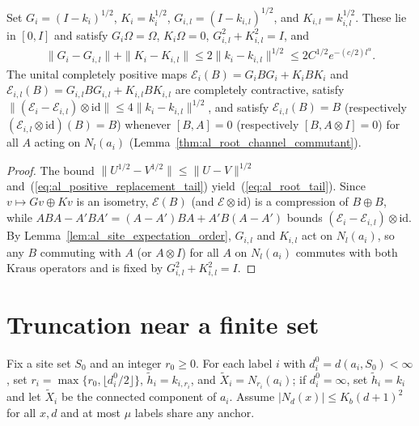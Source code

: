 \begin{lemma}
    \label{lem:al_quasilocal_roots}
    \leanok
    Set $G_i=(I-k_i)^{1/2}$, $K_i=k_i^{1/2}$, $G_{i,l}=(I-k_{i,l})^{1/2}$, and
    $K_{i,l}=k_{i,l}^{1/2}$. These lie in $[0,I]$ and satisfy
    $G_i\Omega=\Omega$, $K_i\Omega=0$, $G_{i,l}^2+K_{i,l}^2=I$, and
    \begin{align}
        \|G_i-G_{i,l}\|+\|K_i-K_{i,l}\|
        \le2\|k_i-k_{i,l}\|^{1/2}\le2C^{1/2}e^{-(c/2)l^\alpha}.
        \label{eq:al_root_tail}
    \end{align}
    The unital completely positive maps $\mathcal E_i(B)=G_iBG_i+K_iBK_i$ and
    $\mathcal E_{i,l}(B)=G_{i,l}BG_{i,l}+K_{i,l}BK_{i,l}$ are completely
    contractive, satisfy
    $\|(\mathcal E_i-\mathcal E_{i,l})\otimes\mathrm{id}\|\le4\|k_i-k_{i,l}\|^{1/2}$,
    and satisfy $\mathcal E_{i,l}(B)=B$ (respectively
    $(\mathcal E_{i,l}\otimes\mathrm{id})(B)=B$) whenever $[B,A]=0$ (respectively
    $[B,A\otimes I]=0$) for all $A$ acting on $N_l(a_i)$
    (Lemma~\ref{thm:al_root_channel_commutant}).
\end{lemma}
\begin{proof}\leanok
    The bound $\|U^{1/2}-V^{1/2}\|\le\|U-V\|^{1/2}$ and~(\ref{eq:al_positive_replacement_tail})
    yield~(\ref{eq:al_root_tail}). Since $v\mapsto Gv\oplus Kv$ is an isometry,
    $\mathcal E(B)$ (and $\mathcal E\otimes\mathrm{id}$) is a compression of
    $B\oplus B$, while $ABA-A'BA'=(A-A')BA+A'B(A-A')$ bounds
    $(\mathcal E_i-\mathcal E_{i,l})\otimes\mathrm{id}$. By
    Lemma~\ref{lem:al_site_expectation_order}, $G_{i,l}$ and $K_{i,l}$ act on
    $N_l(a_i)$, so any $B$ commuting with $A$ (or $A\otimes I$) for all $A$ on
    $N_l(a_i)$ commutes with both Kraus operators and is fixed by
    $G_{i,l}^2+K_{i,l}^2=I$.
\end{proof}

\section{Truncation near a finite set}
\label{sec:al_truncation}

Fix a site set $S_0$ and an integer $r_0\ge0$. For each label $i$ with
$d_i^0=d(a_i,S_0)<\infty$, set $r_i=\max\{r_0,\lfloor d_i^0/2\rfloor\}$,
$\widetilde h_i=k_{i,r_i}$, and $\widetilde X_i=N_{r_i}(a_i)$; if
$d_i^0=\infty$, set $\widetilde h_i=k_i$ and let $\widetilde X_i$ be the
connected component of $a_i$. Assume $|N_d(x)|\le K_b(d+1)^2$ for all $x,d$ and
at most $\mu$ labels share any anchor.

